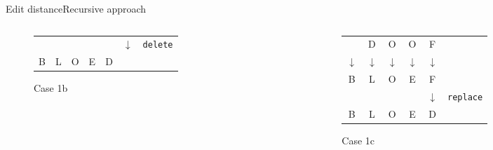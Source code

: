 \begin{frame}{Edit distance}{Recursive approach}
\begin{columns}[T]
\begin{column}{0.3\linewidth}
\begin{figure}[!h]
\begin{center}
\begin{tabular}{c@{}c@{}c@{}c@{}c@{}c@{}l}
            {} & {} & {} & {} & {} & $\downarrow$ & \texttt{delete}\\
            B & L & O & E & D
          \end{tabular}
        \end{center}
        \caption{Case 1b}
      \end{figure}
    \end{column}
    \begin{column}{0.3\linewidth}
      \begin{figure}[!h]
        \begin{center}
          \begin{tabular}{c@{}c@{}c@{}c@{}c@{}l}
            {} & \color{Mittel-Blau}D & \color{Mittel-Blau}O &
            \color{Mittel-Blau}O & \color{Mittel-Blau}F\\
            \color{Mittel-Blau}$\downarrow$ & \color{Mittel-Blau}$\downarrow$ &
            \color{Mittel-Blau}$\downarrow$ & \color{Mittel-Blau}$\downarrow$ &
            \color{Mittel-Blau}$\downarrow$\\
            \color{Mittel-Blau}B & \color{Mittel-Blau}L & \color{Mittel-Blau}O &
            \color{Mittel-Blau}E & \color{Mittel-Blau}F\\
            {} & {} & {} & {} & $\downarrow$ & \texttt{replace}\\
            B & L & O & E & D
          \end{tabular}
        \end{center}
        \caption{Case 1c}
      \end{figure}
    \end{column}
  \end{columns}
\end{frame}


